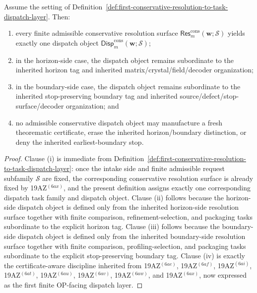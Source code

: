 \begin{proposition}
\label{prop:every-finite-admissible-conservative-resolution-surface-yields-exactly-one-route-faithful-conservative-dispatch-object}
Assume the setting of Definition~\ref{def:first-conservative-resolution-to-task-dispatch-layer}. Then:
\begin{enumerate}[label=(\roman*)]
  \item every finite admissible conservative resolution surface \(\mathsf{Res}^{\mathrm{cons}}_{m}(\mathbf w;\mathcal S)\) yields exactly one dispatch object \(\mathsf{Disp}^{\mathrm{cons}}_{m}(\mathbf w;\mathcal S)\);
  \item in the horizon-side case, the dispatch object remains subordinate to the inherited horizon tag and inherited matrix/crystal/field/decoder organization;
  \item in the boundary-side case, the dispatch object remains subordinate to the inherited stop-preserving boundary tag and inherited source/defect/stop-surface/decoder organization; and
  \item no admissible conservative dispatch object may manufacture a fresh theorematic certificate, erase the inherited horizon/boundary distinction, or deny the inherited earliest-boundary stop.
\end{enumerate}
\end{proposition}

\begin{proof}
Clause (i) is immediate from Definition~\ref{def:first-conservative-resolution-to-task-dispatch-layer}: once the intake side and finite admissible request subfamily \(\mathcal S\) are fixed, the corresponding conservative resolution surface is already fixed by 19AZ$^{(6ax)}$, and the present definition assigns exactly one corresponding dispatch task family and dispatch object. Clause (ii) follows because the horizon-side dispatch object is defined only from the inherited horizon-side resolution surface together with finite comparison, refinement-selection, and packaging tasks subordinate to the explicit horizon tag. Clause (iii) follows because the boundary-side dispatch object is defined only from the inherited boundary-side resolution surface together with finite comparison, profiling-selection, and packaging tasks subordinate to the explicit stop-preserving boundary tag. Clause (iv) is exactly the certificate-aware discipline inherited from 19AZ$^{(6ae)}$, 19AZ$^{(6af)}$, 19AZ$^{(6ai)}$, 19AZ$^{(6at)}$, 19AZ$^{(6au)}$, 19AZ$^{(6av)}$, 19AZ$^{(6aw)}$, and 19AZ$^{(6ax)}$, now expressed as the first finite OP-facing dispatch layer.
\end{proof}

